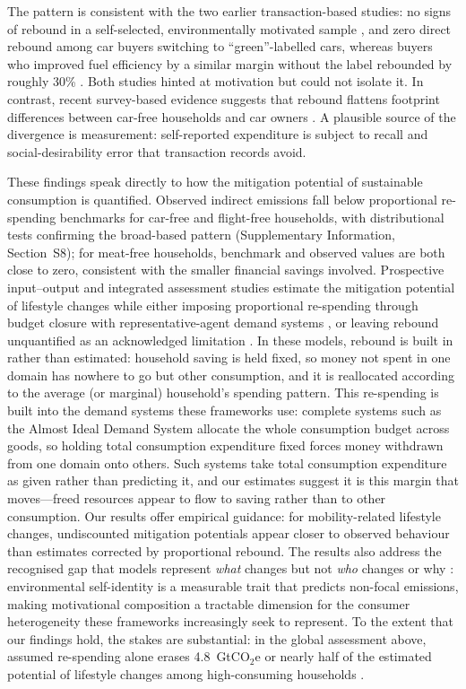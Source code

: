 \documentclass[sn-nature]{sn-jnl}
\begin{document}
The pattern is consistent with the two earlier transaction-based studies: no signs of rebound in a self-selected, environmentally motivated sample \citep{AnderssonNassen2023}, and zero direct rebound among car buyers switching to ``green''-labelled cars, whereas buyers who improved fuel efficiency by a similar margin without the label rebounded by roughly 30\% \citep{andersson2019estimating}. Both studies hinted at motivation but could not isolate it. In contrast, recent survey-based evidence suggests that rebound flattens footprint differences between car-free households and car owners \citep{ottelin2024rebound}. A plausible source of the divergence is measurement: self-reported expenditure is subject to recall and social-desirability error that transaction records avoid.

These findings speak directly to how the mitigation potential of sustainable consumption is quantified. Observed indirect emissions fall below proportional re-spending benchmarks for car-free and flight-free households, with distributional tests confirming the broad-based pattern (Supplementary Information, Section~S8); for meat-free households, benchmark and observed values are both close to zero, consistent with the smaller financial savings involved. Prospective input--output and integrated assessment studies estimate the mitigation potential of lifestyle changes while either imposing proportional re-spending through budget closure with representative-agent demand systems \citep{Chitnis2013,Deaton1980,Gillingham2016,Niamir2020,Bjelle2018,grabs2015rebound}, or leaving rebound unquantified as an acknowledged limitation \citep{cap2025reduction}. In these models, rebound is built in rather than estimated: household saving is held fixed, so money not spent in one domain has nowhere to go but other consumption, and it is reallocated according to the average (or marginal) household's spending pattern. This re-spending is built into the demand systems these frameworks use: complete systems such as the Almost Ideal Demand System \citep{Deaton1980} allocate the whole consumption budget across goods, so holding total consumption expenditure fixed forces money withdrawn from one domain onto others. Such systems take total consumption expenditure as given rather than predicting it, and our estimates suggest it is this margin that moves---freed resources appear to flow to saving rather than to other consumption. Our results offer empirical guidance: for mobility-related lifestyle changes, undiscounted mitigation potentials appear closer to observed behaviour than estimates corrected by proportional rebound. The results also address the recognised gap that models represent \emph{what} changes but not \emph{who} changes or why \citep{scherer2025lifestyle,vandenberg2019improved}: environmental self-identity is a measurable trait that predicts non-focal emissions, making motivational composition a tractable dimension for the consumer heterogeneity these frameworks increasingly seek to represent. To the extent that our findings hold, the stakes are substantial: in the global assessment above, assumed re-spending alone erases 4.8~GtCO$_2$e or nearly half of the estimated potential of lifestyle changes among high-consuming households \citep{guan2025unlocking}.
\end{document}
